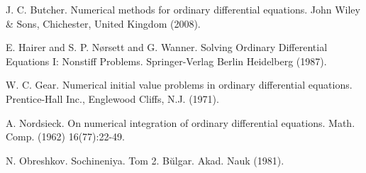 
\begin{thebibliography}{10}

{\sc J. C. Butcher}. {Numerical methods for ordinary differential equations}. John Wiley \& Sons, Chichester, United Kingdom (2008).



{\sc E. Hairer and S. P. N\o rsett and G. Wanner}. {Solving Ordinary Differential Equations I: Nonstiff Problems}. Springer-Verlag Berlin Heidelberg (1987).



{\sc W. C. Gear}. {Numerical initial value problems in ordinary differential equations}. Prentice-Hall Inc., Englewood Cliffs, N.J. (1971).



{\sc A. Nordsieck}. {On numerical integration of ordinary differential equations}. Math. Comp. (1962) 16(77):22-49.



{\sc N. Obreshkov}. {Sochineniya. Tom 2}. B\u ulgar. Akad. Nauk (1981).

\end{thebibliography}
